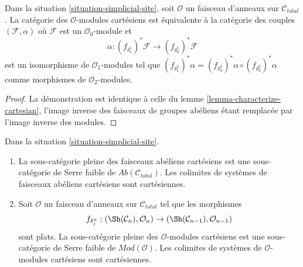 \begin{lemma}
\label{lemma-characterize-cartesian-modules}
Dans la situation \ref{situation-simplicial-site},
soit $\mathcal{O}$ un faisceau d'anneaux sur $\mathcal{C}_{total}$.
La catégorie des $\mathcal{O}$-modules cartésiens
est équivalente à la catégorie des couples $(\mathcal{F}, \alpha)$
où $\mathcal{F}$ est un $\mathcal{O}_0$-module
et
$$
\alpha :
(f_{\delta_1^1})^*\mathcal{F}
\longrightarrow (f_{\delta_0^1})^*\mathcal{F}
$$
est un isomorphisme de $\mathcal{O}_1$-modules tel que
$(f_{\delta^2_1})^*\alpha =
(f_{\delta^2_0})^*\alpha \circ (f_{\delta^2_2})^*\alpha$
comme morphismes de $\mathcal{O}_2$-modules.
\end{lemma}

\begin{proof}
La démonstration est identique à celle du
lemme \ref{lemma-characterize-cartesian},
l'image inverse des faisceaux de groupes abéliens étant remplacée
par l'image inverse des modules.
\end{proof}

\begin{lemma}
\label{lemma-Serre-subcat-cartesian-modules}
Dans la situation \ref{situation-simplicial-site}.
\begin{enumerate}
\item La sous-catégorie pleine des faisceaux abéliens cartésiens est une
sous-catégorie de Serre faible de $\textit{Ab}(\mathcal{C}_{total})$.
Les colimites de systèmes de faisceaux abéliens cartésiens sont cartésiennes.
\item Soit $\mathcal{O}$ un faisceau d'anneaux sur $\mathcal{C}_{total}$
tel que les morphismes
$$
f_{\delta^n_j} : (\Sh(\mathcal{C}_n), \mathcal{O}_n)
\to (\Sh(\mathcal{C}_{n - 1}), \mathcal{O}_{n - 1})
$$
sont plats. La sous-catégorie pleine des $\mathcal{O}$-modules cartésiens est une
sous-catégorie de Serre faible de $\textit{Mod}(\mathcal{O})$.
Les colimites de systèmes de $\mathcal{O}$-modules cartésiens sont cartésiennes.
\end{enumerate}
\end{lemma}

